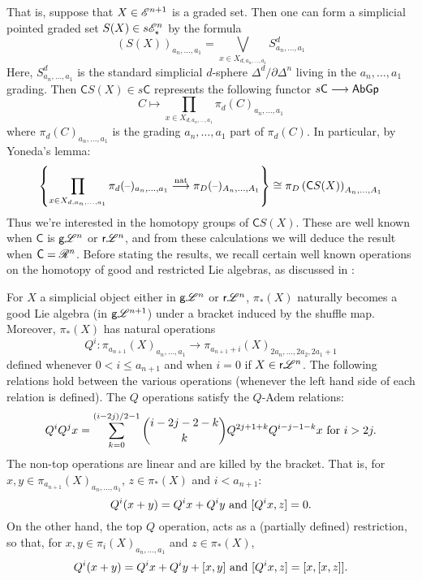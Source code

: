 \documentclass[11pt]{article}
\newcommand{\GS}[1]{\scrE^{#1}}
\newcommand{\GpS}[1]{\scrE^{#1}_\star}
\newcommand{\RestLie}[1]{\mathsf{r}{\scrL}^{#1}}%
\newcommand{\GoodLie}[1]{\mathsf{g}{\scrL}^{#1}}%
\newcommand{\PRLie}[1]{\scrR^{#1}}%
\newcommand{\Fr}[1]{#1}%
\newcommand{\LambdaOp}{Q}
\begin{document}
\begin{CategoriesOfInterest}
That is, suppose that $X\in\GS{n+1}$ is a graded set. Then one can form a simplicial pointed graded set $S(X)\in s\GpS{n}$ by the formula
\[(S(X))_{a_n,\ldots,a_1}=\bigvee_{x\in X_{d,a_n,\ldots,a_1}}S^d_{a_n,\ldots,a_1}\]
Here, $S^d_{a_n,\ldots,a_1}$ is the standard simplicial $d$-sphere $\Delta^d/\partial\Delta^n$ living in the $a_n,\ldots,a_1$ grading.
Then $\Fr{\mathsf{C}}S(X)\in s\mathsf{C}$ represents the following functor $s\mathsf{C}\longrightarrow\operatorname{{\mathsf{AbGp}}}$
\[C\mapsto \prod_{x\in X_{d,a_n,\ldots,a_1}}\pi_d(C)_{a_n,\ldots,a_1}\]
where $\pi_d(C)_{a_n,\ldots,a_1}$ is the grading $a_n,\ldots,a_1$ part of $\pi_d(C)$. In particular, by Yoneda's lemma:
\[\left\{\prod_{x\in X_{d,a_n,\ldots,a_1}}\pi_d(\DASH)_{a_n,\ldots,a_1}\overset{\textup{nat}}{\to}\pi_D(\DASH)_{A_n,\ldots,A_1}\right\}\cong\pi_D\left(\Fr{\mathsf{C}}S(X)\right)_{A_n,\ldots,A_1}\]
Thus we're interested in the homotopy groups of $\mathsf{C}S(X)$. These are well known when $\mathsf{C}$ is $\GoodLie{n}$ or $\RestLie{n}$, and from these calculations we will deduce the result when $\mathsf{C}=\PRLie{n}$. Before stating the results, we recall certain well known operations on the homotopy of good and restricted Lie algebras, as discussed in \cite[Thm 7.12, Prop 8.8]{CurtisSimplicialHtpy.pdf}:
\begin{prop*}
For $X$ a simplicial object either in $\GoodLie{n}$ or $\RestLie{n}$, $\pi_{*}(X)$ naturally becomes a good Lie algebra (in $\GoodLie{n+1}$) under a bracket induced by the shuffle map. Moreover, $\pi_{*}(X)$ has natural operations
\[\LambdaOp^i:\pi_{a_{n+1}}(X)_{a_n,\ldots,a_1}\to \pi_{a_{n+1}+i}(X)_{2a_n,\ldots,2a_2,2a_1+1}
\]
defined whenever $0<i\leq a_{n+1}$ and when $i=0$ if $X\in\RestLie{n}$. The following relations hold between the various operations (whenever the left hand side of each relation is defined).
The $\LambdaOp$ operations satisfy the $\LambdaOp$-Adem relations:%
\[\LambdaOp^i\LambdaOp^jx=\sum_{k=0}^{(i-2j)/2-1}{i-2j-2-k\choose k}\LambdaOp^{2j+1+k}\LambdaOp^{i-j-1-k}x\textup{ for }i>2j.\]
The non-top operations are linear and are killed by the bracket.
That is, for $x,y\in \pi_{a_{n+1}}(X)_{a_n,\ldots,a_1}$, $z\in \pi_*(X)$ and $i<a_{n+1}$: \[\LambdaOp^i{(x+y)}=\LambdaOp^i{x}+\LambdaOp^i{y}\textup{ and }[\LambdaOp^i{x},z]=0.\]
On the other hand, the top $\LambdaOp$ operation, 
acts as a (partially defined) restriction, so that, for $x,y\in \pi_i(X)_{ a_{n},\ldots,a_1}$ and $z\in \pi_*(X)$,
\[\LambdaOp^i(x+y)=\LambdaOp^ix+\LambdaOp^iy+[x,y]\textup{ and }[\LambdaOp^{i}x,z]=[x,[x,z]].\]


\end{prop*}
\end{CategoriesOfInterest}
\end{document}
